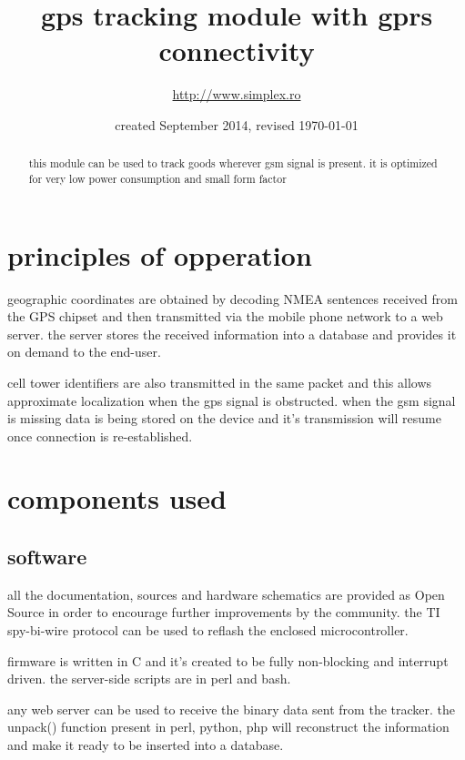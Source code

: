 \documentclass[a4paper,twoside]{refart}
\begin{document}
\title{gps tracking module with gprs connectivity}
\author{\url{http://www.simplex.ro}}
\date{created September 2014, revised \today}
\maketitle

\begin{abstract}
this module can be used to track goods wherever gsm signal is present. it is optimized for very low power consumption and small form factor
\end{abstract}


\tableofcontents
\newpage

\section{principles of opperation}
geographic coordinates are obtained by decoding NMEA sentences received from the GPS chipset and then transmitted via the mobile phone network to a web server. the server stores the received information into a database and provides it on demand to the end-user.

cell tower identifiers are also transmitted in the same packet and this allows approximate localization when the gps signal is obstructed. when the gsm signal is missing data is being stored on the device and it's transmission will resume once connection is re-established.


\section{components used}
\subsection{software}

all the documentation, sources and hardware schematics are provided as Open Source in order to encourage further improvements by the community. the TI spy-bi-wire protocol can be used to reflash the enclosed microcontroller.

firmware is written in C and it's created to be fully non-blocking and interrupt driven. the server-side scripts are in perl and bash.

any web server can be used to receive the binary data sent from the tracker. the unpack() function present in perl, python, php will reconstruct the information and make it ready to be inserted into a database.
\end{document}

